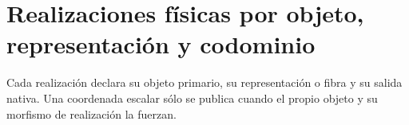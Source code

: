 \section{Realizaciones físicas por objeto, representación y codominio}
Cada realización declara su objeto primario, su representación o fibra y su salida nativa. Una coordenada escalar sólo se publica cuando el propio objeto y su morfismo de realización la fuerzan.

